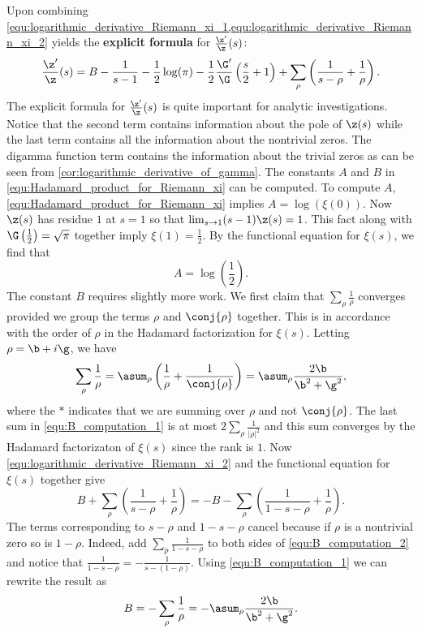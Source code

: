       Upon combining \cref{equ:logarithmic_derivative_Riemann_xi_1,equ:logarithmic_derivative_Riemann_xi_2} yields the \textbf{explicit formula} for $\frac{\z'}{\z}(s)$:
      \[
        \frac{\z'}{\z}(s) = B-\frac{1}{s-1}-\frac{1}{2}\log(\pi)-\frac{1}{2}\frac{\G'}{\G}\left(\frac{s}{2}+1\right)+\sum_{\rho}\left(\frac{1}{s-\rho}+\frac{1}{\rho}\right).
      \]
      The explicit formula for $\frac{\z'}{\z}(s)$ is quite important for analytic investigations. Notice that the second term contains information about the pole of $\z(s)$ while the last term contains all the information about the nontrivial zeros. The digamma function term contains the information about the trivial zeros as can be seen from \cref{cor:logarithmic_derivative_of_gamma}. The constants $A$ and $B$ in \cref{equ:Hadamard_product_for_Riemann_xi} can be computed. To compute $A$, \cref{equ:Hadamard_product_for_Riemann_xi} implies $A = \log(\xi(0))$. Now $\z(s)$ has residue $1$ at $s = 1$ so that $\lim_{s \to 1}(s-1)\z(s) = 1$. This fact along with $\G\left(\frac{1}{2}\right) = \sqrt{\pi}$ together imply $\xi(1) = \frac{1}{2}$. By the functional equation for $\xi(s)$, we find that
      \[
        A = \log\left(\frac{1}{2}\right).
      \]
      The constant $B$ requires slightly more work. We first claim that $\sum_{\rho}\frac{1}{\rho}$ converges provided we group the terms $\rho$ and $\conj{\rho}$ together. This is in accordance with the order of $\rho$ in the Hadamard factorization for $\xi(s)$. Letting $\rho = \b+i\g$, we have
      \begin{equation}\label{equ:B_computation_1}
        \sum_{\rho}\frac{1}{\rho} = \asum_{\rho}\left(\frac{1}{\rho}+\frac{1}{\conj{\rho}}\right) = \asum_{\rho}\frac{2\b}{\b^{2}+\g^{2}},
      \end{equation}
      where the $\ast$ indicates that we are summing over $\rho$ and not $\conj{\rho}$. The last sum in \cref{equ:B_computation_1} is at most $2\sum_{\rho}\frac{1}{|\rho|^{2}}$ and this sum converges by the Hadamard factorizaton of $\xi(s)$ since the rank is $1$. Now \cref{equ:logarithmic_derivative_Riemann_xi_2} and the functional equation for $\xi(s)$ together give
      \begin{equation}\label{equ:B_computation_2}
        B+\sum_{\rho}\left(\frac{1}{s-\rho}+\frac{1}{\rho}\right) = -B-\sum_{\rho}\left(\frac{1}{1-s-\rho}+\frac{1}{\rho}\right).
      \end{equation}
      The terms corresponding to $s-\rho$ and $1-s-\rho$ cancel because if $\rho$ is a nontrivial zero so is $1-\rho$. Indeed, add $\sum_{p}\frac{1}{1-s-\rho}$ to both sides of \cref{equ:B_computation_2} and notice that $\frac{1}{1-s-\rho} = -\frac{1}{s-(1-\rho)}$. Using \cref{equ:B_computation_1} we can rewrite the result as
      \[
        B = -\sum_{\rho}\frac{1}{\rho} = -\asum_{\rho}\frac{2\b}{\b^{2}+\g^{2}}.
      \]
